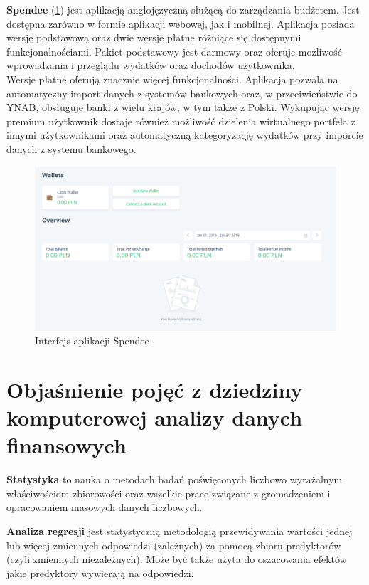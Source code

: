 \textbf{Spendee} (\ref{spendee_interfejs}) jest aplikacją anglojęzyczną służącą do zarządzania budżetem. Jest dostępna zarówno w formie aplikacji webowej, jak i mobilnej. Aplikacja posiada wersję podstawową oraz dwie wersje płatne różniące się dostępnymi funkcjonalnościami. Pakiet podstawowy jest darmowy oraz oferuje możliwość wprowadzania i przeglądu wydatków oraz dochodów użytkownika.\\
Wersje płatne oferują znacznie więcej funkcjonalności. Aplikacja pozwala na automatyczny import danych z systemów bankowych oraz, w przeciwieństwie do YNAB, obsługuje banki z wielu krajów, w tym także z Polski. Wykupując wersję premium użytkownik dostaje również możliwość dzielenia wirtualnego portfela z innymi użytkownikami oraz automatyczną kategoryzację wydatków przy imporcie danych z systemu bankowego.
\begin{figure}[h!]
	\begin{center}
		\includegraphics[width=6in]{img/aplikacje/spendee_interfejs.png}
		\caption{Interfejs aplikacji Spendee}
		\label{spendee_interfejs}
	\end{center}
\end{figure}

\section{Objaśnienie pojęć z dziedziny komputerowej analizy danych finansowych}
\textbf{Statystyka} to nauka o metodach badań poświęconych liczbowo wyrażalnym właściwościom zbiorowości oraz wszelkie prace związane z gromadzeniem i opracowaniem masowych danych liczbowych.\cite{bptstatystyka}

\textbf{Analiza regresji} jest statystyczną metodologią przewidywania wartości jednej lub więcej zmiennych odpowiedzi (zależnych) za pomocą zbioru predyktorów (czyli zmiennych niezależnych). Może być także użyta do oszacowania efektów jakie predyktory wywierają na odpowiedzi.\cite{wielowymiarowymodelregresjiliniowej2014}

